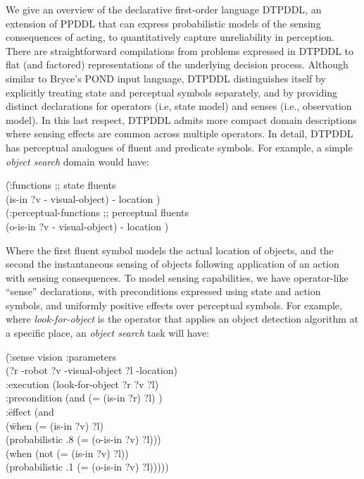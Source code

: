 


We give an overview of the declarative first-order language DTPDDL, an
extension of PPDDL that can express probabilistic models of the
sensing consequences of acting, to quantitatively capture
unreliability in perception. There are straightforward compilations
from problems expressed in DTPDDL to flat (and factored)
representations of the underlying decision process. Although similar
to Bryce's POND input language, DTPDDL distinguishes itself by
explicitly treating state and perceptual symbols separately, and by
providing distinct declarations for operators (i.e, state model) and
senses (i.e., observation model). In this last respect, DTPDDL admits
more compact domain descriptions where sensing effects are common
across multiple operators. In detail, DTPDDL has perceptual analogues of
fluent and predicate symbols. For example, a simple {\em object search}
domain would have:

\vspace{-1ex}
\small
\begin{tabtt}
(\=:functions  ;; state fluents\\
  \> (is-in ?v - visual-object) - location )\\
(:perceptual-functions  ;; perceptual fluents\\
  \> (o-is-in ?v - visual-object) - location )
\end{tabtt}
\normalsize
\vspace{-1ex}

\noindent Where the first fluent symbol models the actual location of
objects, and the second the instantaneous sensing of objects
following application of an action with sensing consequences.
To model sensing capabilities, we have operator-like ``sense''
declarations, with preconditions expressed using state and action
symbols, and uniformly positive effects over perceptual symbols. For
example, where {\em look-for-object} is the operator that applies an
object detection algorithm at a specific place, an {\em
object search} task will have:

\vspace{-1ex}
\small
\begin{tabtt}
(\= :sense vision  :parameters \+ \\
  (?r -robot ?v -visual-object ?l -location) \\
 :execution  (look-for-object ?r ?v ?l) \\
 :precondition (and (= (is-in ?r) ?l) ) \\
 :\=effect (and \+\\
    (\= when (= (is-in ?v) ?l)\\
    \>(probabilistic .8 (= (o-is-in ?v) ?l))) \\
   (when (not (= (is-in ?v) ?l)) \\
    \>(probabilistic .1 (= (o-is-in ?v) ?l))))) \\
\end{tabtt}
\normalsize
\vspace{-3ex}

